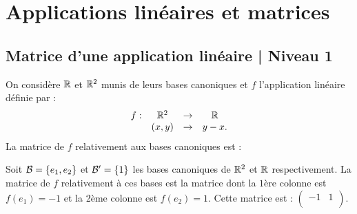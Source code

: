 


\section{Applications linéaires et matrices}

\subsection{Matrice d'une application linéaire | Niveau 1}

\begin{question}
On considère $\mathbb{R}$ et $\mathbb{R}^2$ munis de leurs bases canoniques et $f$ l'application linéaire définie par :
$$\begin{array}{rccc}f:&\mathbb{R}^2 &\to& \mathbb{R}\\
& (x,y)&\to &y-x.  \end{array}$$
La matrice de $f$ relativement aux bases canoniques est :
\begin{answers}  
\end{answers}
\begin{explanations} Soit ${\cal {B}}=\{e_1,e_2\}$ et ${\cal {B}}'=\{1\}$ les bases canoniques de $\mathbb{R}^2$ et $\mathbb{R}$ 
respectivement. La matrice de $f$ relativement à ces bases est la matrice dont la $1$ère colonne est $f(e_1)=-1$ et la 2ème colonne est $f(e_2)=1$. Cette matrice est : $\left(\begin{array}{rc}
-1&1\\ \end{array}\right).$
\end{explanations}
\end{question}

